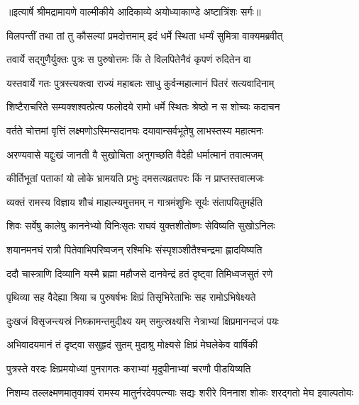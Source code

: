 {॥इत्यार्षे श्रीमद्रामायणे वाल्मीकीये आदिकाव्ये अयोध्याकाण्डे अष्टात्रिंशः सर्गः॥}


\twolineshloka
{विलपन्तीं तथा तां तु कौसल्यां प्रमदोत्तमाम्}
{इदं धर्मे स्थिता धर्म्यं सुमित्रा वाक्यमब्रवीत्} %

\twolineshloka
{तवार्ये सद्गुणैर्युक्तः पुत्रः स पुरुषोत्तमः}
{किं ते विलपितेनैवं कृपणं रुदितेन वा} %

\twolineshloka
{यस्तवार्ये गतः पुत्रस्त्यक्त्वा राज्यं महाबलः}
{साधु कुर्वन्महात्मानं पितरं सत्यवादिनाम्} %

\twolineshloka
{शिष्टैराचरिते सम्यक्शश्वत्प्रेत्य फलोदये}
{रामो धर्मे स्थितः श्रेष्ठो न स शोच्यः कदाचन} %

\twolineshloka
{वर्तते चोत्तमां वृत्तिं लक्ष्मणोऽस्मिन्सदानघः}
{दयावान्सर्वभूतेषु लाभस्तस्य महात्मनः} %

\twolineshloka
{अरण्यवासे यद्दुःखं जानती वै सुखोचिता}
{अनुगच्छति वैदेही धर्मात्मानं तवात्मजम्} %

\twolineshloka
{कीर्तिभूतां पताकां यो लोके भ्रामयति प्रभुः}
{दमसत्यव्रतपरः किं न प्राप्तस्तवात्मजः} %

\twolineshloka
{व्यक्तं रामस्य विज्ञाय शौचं माहात्म्यमुत्तमम्}
{न गात्रमंशुभिः सूर्यः संतापयितुमर्हति} %

\twolineshloka
{शिवः सर्वेषु कालेषु काननेभ्यो विनिःसृतः}
{राघवं युक्तशीतोष्णः सेविष्यति सुखोऽनिलः} %

\twolineshloka
{शयानमनघं रात्रौ पितेवाभिपरिष्वजन्}
{रश्मिभिः संस्पृशञ्शीतैश्चन्द्रमा ह्लादयिष्यति} %

\twolineshloka
{ददौ चास्त्राणि दिव्यानि यस्मै ब्रह्मा महौजसे}
{दानवेन्द्रं हतं दृष्ट्वा तिमिध्वजसुतं रणे} %

\twolineshloka
{पृथिव्या सह वैदेह्या श्रिया च पुरुषर्षभः}
{क्षिप्रं तिसृभिरेताभिः सह रामोऽभिषेक्ष्यते} %

\twolineshloka
{दुःखजं विसृजन्त्यस्रं निष्क्रामन्तमुदीक्ष्य यम्}
{समुत्स्रक्ष्यसि नेत्राभ्यां क्षिप्रमानन्दजं पयः} %

\twolineshloka
{अभिवादयमानं तं दृष्ट्वा ससुहृदं सुतम्}
{मुदाश्रु मोक्ष्यसे क्षिप्रं मेघलेकेव वार्षिकी} %

\twolineshloka
{पुत्रस्ते वरदः क्षिप्रमयोध्यां पुनरागतः}
{कराभ्यां मृदुपीनाभ्यां चरणौ पीडयिष्यति} %

\fourlineindentedshloka
{निशम्य तल्लक्ष्मणमातृवाक्यं}
{ रामस्य मातुर्नरदेवपत्न्याः}
{सद्यः शरीरे विननाश शोकः}
{ शरद्गतो मेघ इवाल्पतोयः} %


